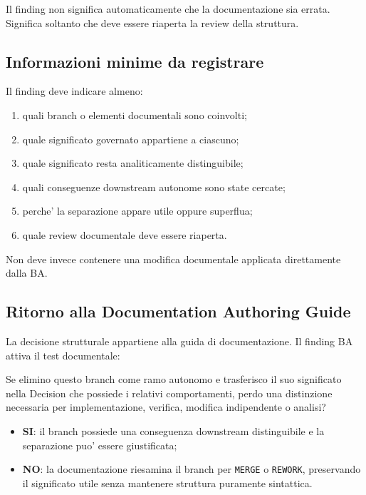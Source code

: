 \documentclass[11pt,a4paper]{article}
\begin{document}
Il finding non significa automaticamente che la documentazione sia errata. Significa soltanto che deve essere riaperta la review della struttura.

\subsection{Informazioni minime da registrare}

Il finding deve indicare almeno:

\begin{enumerate}
  \item quali branch o elementi documentali sono coinvolti;
  \item quale significato governato appartiene a ciascuno;
  \item quale significato resta analiticamente distinguibile;
  \item quali conseguenze downstream autonome sono state cercate;
  \item perche' la separazione appare utile oppure superflua;
  \item quale review documentale deve essere riaperta.
\end{enumerate}

Non deve invece contenere una modifica documentale applicata direttamente dalla BA.

\subsection{Ritorno alla Documentation Authoring Guide}

La decisione strutturale appartiene alla guida di documentazione. Il finding BA attiva il test documentale:

\begin{ddtacheck}[title={Downstream Utility Test - eseguito nel layer documentale}]
Se elimino questo branch come ramo autonomo e trasferisco il suo significato nella Decision che possiede i relativi comportamenti, perdo una distinzione necessaria per implementazione, verifica, modifica indipendente o analisi?
\end{ddtacheck}

\begin{itemize}
  \item \textbf{SI}: il branch possiede una conseguenza downstream distinguibile e la separazione puo' essere giustificata;
  \item \textbf{NO}: la documentazione riesamina il branch per \texttt{MERGE} o \texttt{REWORK}, preservando il significato utile senza mantenere struttura puramente sintattica.
\end{itemize}
\end{document}
